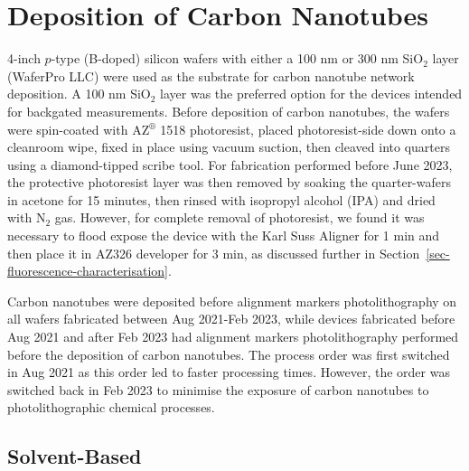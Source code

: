 \documentclass[
  a4paper,
]{scrbook}
\begin{document}
\hypertarget{sec-dep-carbon-nanotubes}{%
\section{Deposition of Carbon
Nanotubes}\label{sec-dep-carbon-nanotubes}}

4-inch \(p\)-type (B-doped) silicon wafers with either a 100 nm or 300
nm SiO\(_2\) layer (WaferPro LLC) were used as the substrate for carbon
nanotube network deposition. A 100 nm SiO\(_2\) layer was the preferred
option for the devices intended for backgated measurements. Before
deposition of carbon nanotubes, the wafers were spin-coated with
AZ\(^\circledR\) 1518 photoresist, placed photoresist-side down onto a
cleanroom wipe, fixed in place using vacuum suction, then cleaved into
quarters using a diamond-tipped scribe tool. For fabrication performed
before June 2023, the protective photoresist layer was then removed by
soaking the quarter-wafers in acetone for 15 minutes, then rinsed with
isopropyl alcohol (IPA) and dried with N\(_2\) gas. However, for
complete removal of photoresist, we found it was necessary to flood
expose the device with the Karl Suss Aligner for 1 min and then place it
in AZ326 developer for 3 min, as discussed further in
Section~\ref{sec-fluorescence-characterisation}.

Carbon nanotubes were deposited before alignment markers
photolithography on all wafers fabricated between Aug 2021-Feb 2023,
while devices fabricated before Aug 2021 and after Feb 2023 had
alignment markers photolithography performed before the deposition of
carbon nanotubes. The process order was first switched in Aug 2021 as
this order led to faster processing times. However, the order was
switched back in Feb 2023 to minimise the exposure of carbon nanotubes
to photolithographic chemical processes.

\hypertarget{solvent-based}{%
\subsection{Solvent-Based}\label{solvent-based}}
\end{document}
